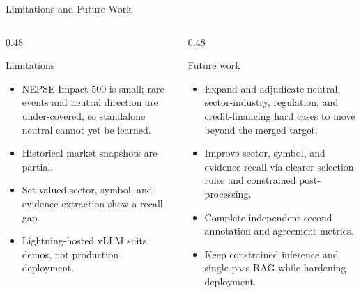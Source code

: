 \documentclass[aspectratio=169,11pt]{beamer}
\begin{document}
\begin{frame}{Limitations and Future Work}
  \begin{columns}[T,onlytextwidth]
    \begin{column}{0.48\textwidth}
      \begin{alertblock}{Limitations}
        \begin{itemize}
          \item NEPSE-Impact-500 is small; rare events and neutral direction are under-covered, so standalone neutral cannot yet be learned.
          \item Historical market snapshots are partial.
          \item Set-valued sector, symbol, and evidence extraction show a recall gap.
          \item Lightning-hosted vLLM suits demos, not production deployment.
        \end{itemize}
      \end{alertblock}
    \end{column}
    \begin{column}{0.48\textwidth}
      \begin{block}{Future work}
        \begin{itemize}
          \item Expand and adjudicate neutral, sector-industry, regulation, and credit-financing hard cases to move beyond the merged target.
          \item Improve sector, symbol, and evidence recall via clearer selection rules and constrained post-processing.
          \item Complete independent second annotation and agreement metrics.
          \item Keep constrained inference and single-pass RAG while hardening deployment.
        \end{itemize}
      \end{block}
    \end{column}
  \end{columns}
\end{frame}
\end{document}
